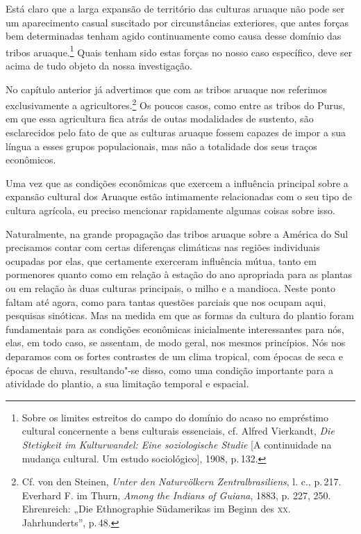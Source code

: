 Está claro que a larga expansão de território das culturas aruaque não
pode ser um aparecimento casual suscitado por circunstâncias exteriores,
que antes forças bem determinadas tenham agido continuamente como causa
desse domínio das tribos aruaque.\footnote{Sobre os limites estreitos do
  campo do domínio do acaso no empréstimo cultural concernente a bens
  culturais essenciais, cf. Alfred Vierkandt, \textit{Die Stetigkeit im
  Kulturwandel: Eine soziologische Studie} {[}A continuidade na mudança
  cultural. Um estudo sociológico{]}, 1908, p.\,132.} Quais tenham sido
estas forças no nosso caso específico, deve ser acima de tudo objeto da
nossa investigação.

No capítulo anterior já advertimos que com as tribos aruaque nos
referimos exclusivamente a agricultores.\footnote{Cf. von den Steinen,
  \textit{Unter den Naturvölkern Zentralbrasiliens}, l. c., p.\,217.
  Everhard F. im Thurn, \textit{Among the Indians of Guiana}, 1883, p.
  227, 250. Ehrenreich: „Die Ethnographie Südamerikas im Beginn des \textsc{xx}.
  Jahrhunderts'', p.\,48.} Os poucos casos, como entre as tribos do
Purus, em que essa agricultura fica atrás de outas modalidades de
sustento, são esclarecidos pelo fato de que as culturas aruaque fossem
capazes de impor a sua língua a esses grupos populacionais, mas não a
totalidade dos seus traços econômicos.

Uma vez que as condições econômicas que exercem a influência principal
sobre a expansão cultural dos Aruaque estão intimamente relacionadas com
o seu tipo de cultura agrícola, eu preciso mencionar rapidamente algumas
coisas sobre isso.

Naturalmente, na grande propagação das tribos aruaque sobre a América do
Sul precisamos contar com certas diferenças climáticas nas regiões
individuais ocupadas por elas, que certamente exerceram influência
mútua, tanto em pormenores quanto como em relação à estação do ano
apropriada para as plantas ou em relação às duas culturas principais, o
milho e a mandioca. Neste ponto faltam até agora, como para tantas
questões parciais que nos ocupam aqui, pesquisas sinóticas. Mas na
medida em que as formas da cultura do plantio foram fundamentais para as
condições econômicas inicialmente interessantes para nós, elas, em todo
caso, se assentam, de modo geral, nos mesmos princípios. Nós nos
deparamos com os fortes contrastes de um clima tropical, com épocas de
seca e épocas de chuva, resultando"-se disso, como uma condição
importante para a atividade do plantio, a sua limitação temporal e
espacial.


